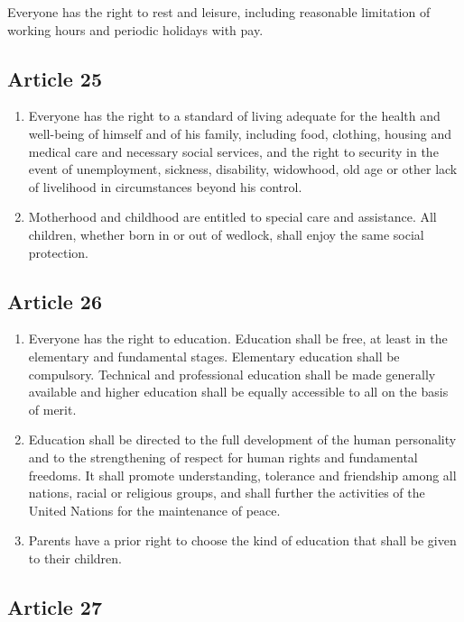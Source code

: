 \documentclass[
  titlepage,
  openright,
  DIV=calc,
  toc=listof,
  listof=nochaptergap]{scrbook}
\begin{document}
Everyone has the right to rest and leisure, including reasonable
limitation of working hours and periodic holidays with pay.

\subsection{Article 25}\label{article-25-1}

\begin{enumerate}
\def\labelenumi{\arabic{enumi}.}
\item
  Everyone has the right to a standard of living adequate for the health
  and well-being of himself and of his family, including food, clothing,
  housing and medical care and necessary social services, and the right
  to security in the event of unemployment, sickness, disability,
  widowhood, old age or other lack of livelihood in circumstances beyond
  his control.
\item
  Motherhood and childhood are entitled to special care and assistance.
  All children, whether born in or out of wedlock, shall enjoy the same
  social protection.
\end{enumerate}

\subsection{Article 26}\label{article-26-1}

\begin{enumerate}
\def\labelenumi{\arabic{enumi}.}
\item
  Everyone has the right to education. Education shall be free, at least
  in the elementary and fundamental stages. Elementary education shall
  be compulsory. Technical and professional education shall be made
  generally available and higher education shall be equally accessible
  to all on the basis of merit.
\item
  Education shall be directed to the full development of the human
  personality and to the strengthening of respect for human rights and
  fundamental freedoms. It shall promote understanding, tolerance and
  friendship among all nations, racial or religious groups, and shall
  further the activities of the United Nations for the maintenance of
  peace.
\item
  Parents have a prior right to choose the kind of education that shall
  be given to their children.
\end{enumerate}

\subsection{Article 27}\label{article-27-1}
\end{document}
